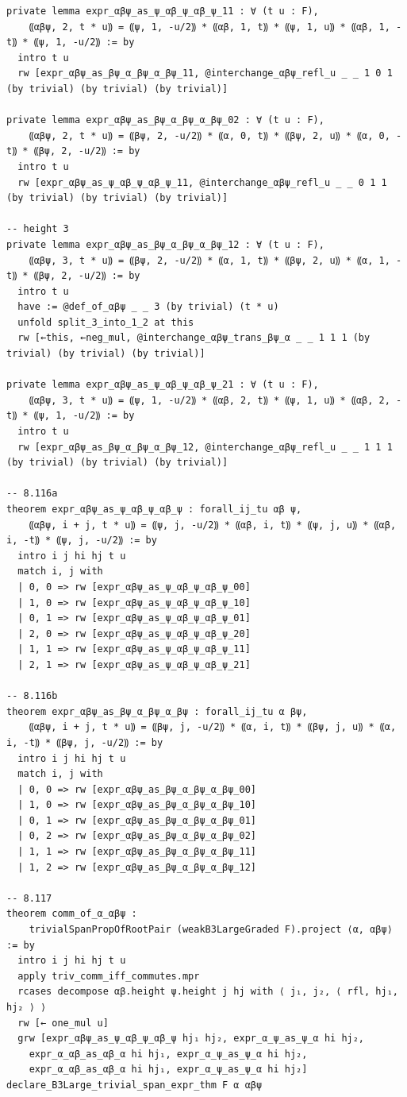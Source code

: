 \documentclass[10pt,a4paper]{article}
\begin{document}
\begin{Verbatim}
private lemma expr_αβψ_as_ψ_αβ_ψ_αβ_ψ_11 : ∀ (t u : F),
    ⸨αβψ, 2, t * u⸩ = ⸨ψ, 1, -u/2⸩ * ⸨αβ, 1, t⸩ * ⸨ψ, 1, u⸩ * ⸨αβ, 1, -t⸩ * ⸨ψ, 1, -u/2⸩ := by
  intro t u
  rw [expr_αβψ_as_βψ_α_βψ_α_βψ_11, @interchange_αβψ_refl_u _ _ 1 0 1 (by trivial) (by trivial) (by trivial)]

private lemma expr_αβψ_as_βψ_α_βψ_α_βψ_02 : ∀ (t u : F),
    ⸨αβψ, 2, t * u⸩ = ⸨βψ, 2, -u/2⸩ * ⸨α, 0, t⸩ * ⸨βψ, 2, u⸩ * ⸨α, 0, -t⸩ * ⸨βψ, 2, -u/2⸩ := by
  intro t u
  rw [expr_αβψ_as_ψ_αβ_ψ_αβ_ψ_11, @interchange_αβψ_refl_u _ _ 0 1 1 (by trivial) (by trivial) (by trivial)]

-- height 3
private lemma expr_αβψ_as_βψ_α_βψ_α_βψ_12 : ∀ (t u : F),
    ⸨αβψ, 3, t * u⸩ = ⸨βψ, 2, -u/2⸩ * ⸨α, 1, t⸩ * ⸨βψ, 2, u⸩ * ⸨α, 1, -t⸩ * ⸨βψ, 2, -u/2⸩ := by
  intro t u
  have := @def_of_αβψ _ _ 3 (by trivial) (t * u)
  unfold split_3_into_1_2 at this
  rw [←this, ←neg_mul, @interchange_αβψ_trans_βψ_α _ _ 1 1 1 (by trivial) (by trivial) (by trivial)]

private lemma expr_αβψ_as_ψ_αβ_ψ_αβ_ψ_21 : ∀ (t u : F),
    ⸨αβψ, 3, t * u⸩ = ⸨ψ, 1, -u/2⸩ * ⸨αβ, 2, t⸩ * ⸨ψ, 1, u⸩ * ⸨αβ, 2, -t⸩ * ⸨ψ, 1, -u/2⸩ := by
  intro t u
  rw [expr_αβψ_as_βψ_α_βψ_α_βψ_12, @interchange_αβψ_refl_u _ _ 1 1 1 (by trivial) (by trivial) (by trivial)]

-- 8.116a
theorem expr_αβψ_as_ψ_αβ_ψ_αβ_ψ : forall_ij_tu αβ ψ,
    ⸨αβψ, i + j, t * u⸩ = ⸨ψ, j, -u/2⸩ * ⸨αβ, i, t⸩ * ⸨ψ, j, u⸩ * ⸨αβ, i, -t⸩ * ⸨ψ, j, -u/2⸩ := by
  intro i j hi hj t u
  match i, j with
  | 0, 0 => rw [expr_αβψ_as_ψ_αβ_ψ_αβ_ψ_00]
  | 1, 0 => rw [expr_αβψ_as_ψ_αβ_ψ_αβ_ψ_10]
  | 0, 1 => rw [expr_αβψ_as_ψ_αβ_ψ_αβ_ψ_01]
  | 2, 0 => rw [expr_αβψ_as_ψ_αβ_ψ_αβ_ψ_20]
  | 1, 1 => rw [expr_αβψ_as_ψ_αβ_ψ_αβ_ψ_11]
  | 2, 1 => rw [expr_αβψ_as_ψ_αβ_ψ_αβ_ψ_21]

-- 8.116b
theorem expr_αβψ_as_βψ_α_βψ_α_βψ : forall_ij_tu α βψ,
    ⸨αβψ, i + j, t * u⸩ = ⸨βψ, j, -u/2⸩ * ⸨α, i, t⸩ * ⸨βψ, j, u⸩ * ⸨α, i, -t⸩ * ⸨βψ, j, -u/2⸩ := by
  intro i j hi hj t u
  match i, j with
  | 0, 0 => rw [expr_αβψ_as_βψ_α_βψ_α_βψ_00]
  | 1, 0 => rw [expr_αβψ_as_βψ_α_βψ_α_βψ_10]
  | 0, 1 => rw [expr_αβψ_as_βψ_α_βψ_α_βψ_01]
  | 0, 2 => rw [expr_αβψ_as_βψ_α_βψ_α_βψ_02]
  | 1, 1 => rw [expr_αβψ_as_βψ_α_βψ_α_βψ_11]
  | 1, 2 => rw [expr_αβψ_as_βψ_α_βψ_α_βψ_12]

-- 8.117
theorem comm_of_α_αβψ :
    trivialSpanPropOfRootPair (weakB3LargeGraded F).project ⟨α, αβψ⟩ := by
  intro i j hi hj t u
  apply triv_comm_iff_commutes.mpr
  rcases decompose αβ.height ψ.height j hj with ⟨ j₁, j₂, ⟨ rfl, hj₁, hj₂ ⟩ ⟩
  rw [← one_mul u]
  grw [expr_αβψ_as_ψ_αβ_ψ_αβ_ψ hj₁ hj₂, expr_α_ψ_as_ψ_α hi hj₂,
    expr_α_αβ_as_αβ_α hi hj₁, expr_α_ψ_as_ψ_α hi hj₂,
    expr_α_αβ_as_αβ_α hi hj₁, expr_α_ψ_as_ψ_α hi hj₂]
declare_B3Large_trivial_span_expr_thm F α αβψ


\end{Verbatim}
\end{document}
